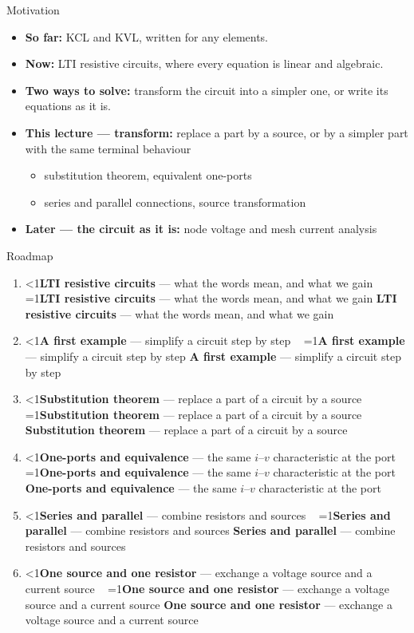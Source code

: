 \documentclass[11pt,aspectratio=169]{beamer}
\newcommand{\rmitem}[3]{%
  \item \ifnum#1<\rmcur\relax \textcolor{black!35}{\textbf{#2} --- #3}
          \ \textcolor{cpow}{\checkmark}%
        \else\ifnum#1=\rmcur\relax \textcolor{metured}{\textbf{#2}} --- #3%
        \else \textbf{#2} --- \textcolor{black!60}{#3}\fi\fi}
\newcommand{\roadmapframe}[1]{%
  \begin{frame}{Roadmap}
    \def\rmcur{#1}%
    \vfill
    \begin{enumerate}\itemsep9pt
      \rmitem{1}{LTI resistive circuits}{what the words mean, and what we gain}
      \rmitem{2}{A first example}{simplify a circuit step by step}
      \rmitem{3}{Substitution theorem}{replace a part of a circuit by a source}
      \rmitem{4}{One-ports and equivalence}{the same $i$--$v$ characteristic at the port}
      \rmitem{5}{Series and parallel}{combine resistors and sources}
      \rmitem{6}{One source and one resistor}{exchange a voltage source and a current source}
    \end{enumerate}
    \vfill
  \end{frame}}
\begin{document}
\begin{frame}{Motivation}
  \vfill
  \begin{itemize}\itemsep10pt
    \item \textbf{So far:} KCL and KVL, written for \alert{any} elements.
    \item<2-> \textbf{Now:} \alert{LTI resistive circuits}, where every equation is
      \alert{linear} and \alert{algebraic}.
    \item<3-> \textbf{Two ways to solve:} \alert{transform} the circuit into a simpler one,
      or write its equations \alert{as it is}.
    \item<4-> \textbf{This lecture --- transform:} replace a part by a source, or by a simpler
      part with the same terminal behaviour
      \begin{itemize}\itemsep2pt
        \item substitution theorem, equivalent one-ports
        \item series and parallel connections, source transformation
      \end{itemize}
    \item<5-> \textbf{Later --- the circuit as it is:} node voltage and mesh current
      analysis
  \end{itemize}
  \vfill
\end{frame}

\roadmapframe{1}
\end{document}
